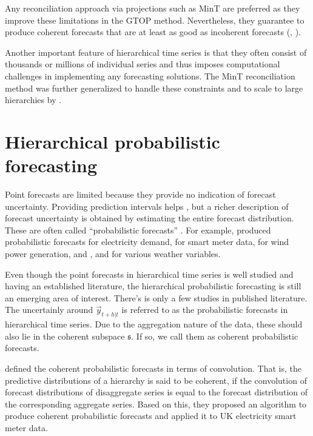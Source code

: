 \documentclass[graybox]{svmult}
\begin{document}
Any reconciliation approach via projections such as MinT are preferred as they improve these limitations in the GTOP method. Nevertheless, they guarantee to produce coherent forecasts that are at least as good as incoherent forecasts (\cite{Wickramasuriya2018}, \cite{Gamakumara2018}). 


Another important feature of hierarchical time series is that they often consist of thousands or millions of individual series and thus imposes computational challenges in implementing any forecasting solutions. The MinT reconciliation method was further generalized to handle these constraints and to scale to large hierarchies by \cite{Wickramasuriya2018}. 


\section{Hierarchical probabilistic forecasting}

Point forecasts are limited because they provide no indication of forecast uncertainty. Providing prediction intervals helps \citep{Shang2017a}, but a richer description of forecast uncertainty is obtained by estimating the entire forecast distribution. These are often called ``probabilistic forecasts'' \citep{Gneiting2014}. For example, \citet{McSharry2005} produced probabilistic forecasts for electricity demand, \citet{BenTaieb2017} for smart meter data, \citet{Pinson2009} for wind power generation, and \citet{Gel2004}, \citet{Gneiting2005a} and \citet{Gneiting2005} for various weather variables.

Even though the point forecasts in hierarchical time series is well studied and having an established literature, the hierarchical probabilistic forecasting is still an emerging area of interest. There's is only a few studies in published literature. The uncertainly around $\vec{y}_{t+h|t}$ is referred to as the probabilistic forecasts in hierarchical time series. Due to the aggregation nature of the data, these should also lie in the coherent subspace $\mathfrak{s}$. If so, we call them as coherent probabilistic forecasts.    

\cite{Taieb2017} defined the coherent probabilistic forecasts in terms of convolution. That is, the predictive distributions of a hierarchy is said to be coherent, if the convolution of forecast distributions of disaggregate series is equal to the forecast distribution of the corresponding aggregate series. Based on this, they proposed an algorithm to produce coherent probabilistic forecasts and applied it to UK electricity smart meter data. 
\end{document}
